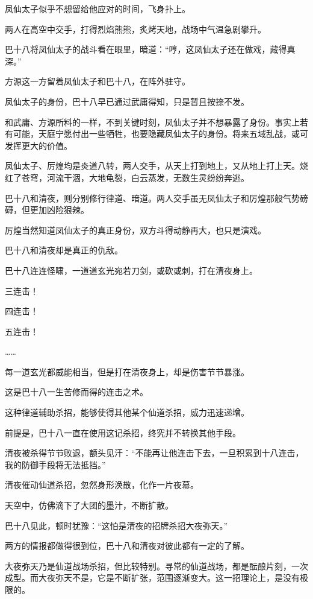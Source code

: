 \begin{this_body}
凤仙太子似乎不想留给他应对的时间，飞身扑上。

两人在高空中交手，打得烈焰熊熊，炙烤天地，战场中气温急剧攀升。

巴十八将凤仙太子的战斗看在眼里，暗道：“哼，这凤仙太子还在做戏，藏得真深。”

方源这一方留着凤仙太子和巴十八，在阵外驻守。

凤仙太子的身份，巴十八早已通过武庸得知，只是暂且按捺不发。

和武庸、方源所料的一样，不到关键时刻，凤仙太子并不想暴露了身份。事实上若有可能，天庭宁愿付出一些牺牲，也要隐藏凤仙太子的身份。将来五域乱战，或可发挥更大的价值。

凤仙太子、厉煌均是炎道八转，两人交手，从天上打到地上，又从地上打上天。烧红了苍穹，河流干涸，大地龟裂，白云蒸发，无数生灵纷纷奔逃。

巴十八和清夜，则分别修行律道、暗道。两人交手虽无凤仙太子和厉煌那般气势磅礴，但更加凶险狠辣。

厉煌当然知道凤仙太子的真正身份，双方斗得动静再大，也只是演戏。

巴十八和清夜却是真正的仇敌。

巴十八连连怪啸，一道道玄光宛若刀剑，或砍或刺，打在清夜身上。

三连击！

四连击！

五连击！

……

每一道玄光都威能相当，但是打在清夜身上，却是伤害节节暴涨。

这是巴十八一生苦修而得的连击之术。

这种律道辅助杀招，能够使得其他某个仙道杀招，威力迅速递增。

前提是，巴十八一直在使用这记杀招，终究并不转换其他手段。

清夜被杀得节节败退，额头见汗：“不能再让他连击下去，一旦积累到十八连击，我的防御手段将无法抵挡。”

清夜催动仙道杀招，忽然身形涣散，化作一片夜幕。

天空中，仿佛滴下了大团的墨汁，不断扩散。

巴十八见此，顿时犹豫：“这怕是清夜的招牌杀招大夜弥天。”

两方的情报都做得很到位，巴十八和清夜对彼此都有一定的了解。

大夜弥天乃是仙道战场杀招，但比较特别。寻常的仙道战场，都是酝酿片刻，一次成型。而大夜弥天不是，它是不断扩张，范围逐渐变大。这一招理论上，是没有极限的。


\end{this_body}

